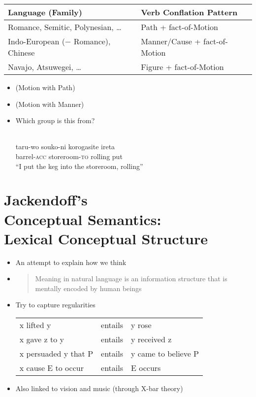 \documentclass[headrule,footrule]{foils}
\begin{document}
\bigskip
\begin{center}
\begin{tabular}{ll}
  \textbf{Language (Family)} & \textbf{Verb Conflation Pattern} \\ \hline
  Romance, Semitic, Polynesian, \ldots & Path + fact-of-Motion \\
  Indo-European ($-$ Romance), Chinese & Manner/Cause + fact-of-Motion \\
  Navajo, Atsuwegei, \ldots & Figure + fact-of-Motion 
\end{tabular}
\end{center}

\begin{itemize}
\item {} (Motion with Path)
\item {} (Motion with Manner)
\item Which group is this from?
 \begin{exe}
    \ex \glll {}    \\
    taru-wo souko-ni korogasite ireta \\
    barrel-\textsc{acc} storeroom-\textsc{to} rolling put\\
    \trans ``I put the keg into the storeroom, rolling''
  \end{exe}

\end{itemize}

\section{Jackendoff’s \\ Conceptual Semantics: 
  \\ Lexical Conceptual Structure} 

\begin{itemize}
\item An attempt to explain how we think
\item {}
  \begin{quote}
    Meaning in natural language is an information structure that is
    mentally encoded by human beings
  \end{quote}
\item Try to capture regularities
  \\[2ex]\begin{tabular}{lll}
    x lifted y & entails & y rose \\
    x gave z to y & entails & y received z \\
    x persuaded y that P & entails & y came to believe P \\[2ex]
    x cause E to occur & entails & E occurs 
  \end{tabular}

\item Also linked to vision and music (through X-bar theory)
\end{itemize}
\end{document}
